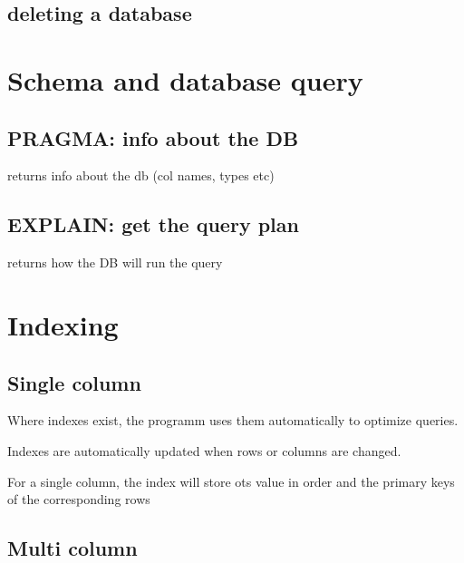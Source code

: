 
	\subsection{deleting a database}




\section{Schema and database query}

	\subsection{PRAGMA: info about the DB}
		
		 returns info about the db (col names, types etc)

	\subsection{EXPLAIN: get the query plan}

		 returns how the DB will run the query

\section{Indexing}

	\subsection{Single column}

		Where indexes exist, the programm uses them automatically to optimize queries.

		Indexes are automatically updated when rows or columns are changed.

		For a single column, the index will store ots value in order and the primary keys of the corresponding rows
		


\subsection{Multi column}

